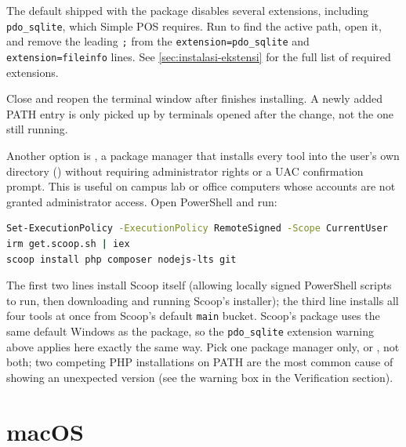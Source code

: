 \begin{warningbox}
The default  shipped with the  package
disables several extensions, including \texttt{pdo\_sqlite}, which Simple
POS requires. Run  to find the active 
path, open it, and remove the leading \texttt{;} from the
\texttt{extension=pdo\_sqlite} and \texttt{extension=fileinfo} lines. See
\cref{sec:instalasi-ekstensi} for the full list of required extensions.
\end{warningbox}

\begin{tipbox}
Close and reopen the terminal window after  finishes
installing. A newly added PATH entry is only picked up by terminals
opened after the change, not the one still running.
\end{tipbox}

Another option is , a package manager that installs every tool
into the user's own directory ()
without requiring administrator rights or a UAC confirmation prompt. This
is useful on campus lab or office computers whose accounts are not granted
administrator access. Open PowerShell and run:

\begin{lstlisting}[language=bash]
Set-ExecutionPolicy -ExecutionPolicy RemoteSigned -Scope CurrentUser
irm get.scoop.sh | iex
scoop install php composer nodejs-lts git
\end{lstlisting}

\begin{notebox}
The first two lines install Scoop itself (allowing locally signed
PowerShell scripts to run, then downloading and running Scoop's
installer); the third line installs all four tools at once from Scoop's
default \texttt{main} bucket. Scoop's  package uses the same
default Windows  as the  package, so the
\texttt{pdo\_sqlite} extension warning above applies here exactly the
same way. Pick one package manager only,  or , not
both; two competing PHP installations on PATH are the most common cause
of  showing an unexpected version (see the warning box in the
Verification section).
\end{notebox}

\section{macOS}

